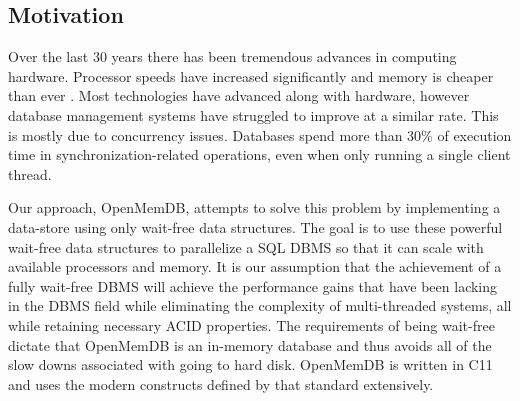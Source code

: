 \documentclass[letter,11pt]{article}
\newcommand{\CC}{C\nolinebreak\hspace{-.05em}\raisebox{.4ex}{\tiny\bf +}\nolinebreak\hspace{-.10em}\raisebox{.4ex}{\tiny\bf +}}
\begin{document}
\subsection{Motivation}
Over the last 30 years there has been tremendous advances in computing
hardware. Processor speeds have increased significantly and memory is cheaper than ever
\cite{stonebraker2007end}. Most technologies have advanced 
along with hardware, however database management systems have struggled to improve
at a similar rate. This is mostly due to concurrency issues. Databases spend more than 30\% 
of execution time in synchronization-related operations, even when only running a single
client thread\cite{soares2015database}.
\par\vspace{\baselineskip}
Our approach, OpenMemDB, attempts to solve this problem by implementing a data-store 
using only wait-free data structures. The goal is to use these powerful wait-free data 
structures to parallelize a SQL DBMS so that it can scale with available processors
and memory. It is our assumption that the achievement of a fully wait-free DBMS will 
achieve the performance gains that have been lacking in the DBMS field while eliminating 
the complexity of multi-threaded systems, all while retaining necessary ACID properties. 
The requirements of being wait-free dictate that OpenMemDB is an in-memory database and 
thus avoids all of the slow downs associated with going to hard disk. OpenMemDB is written 
in \CC 11 and uses the modern constructs defined by that standard extensively.
\par\vspace{\baselineskip}
\end{document}
